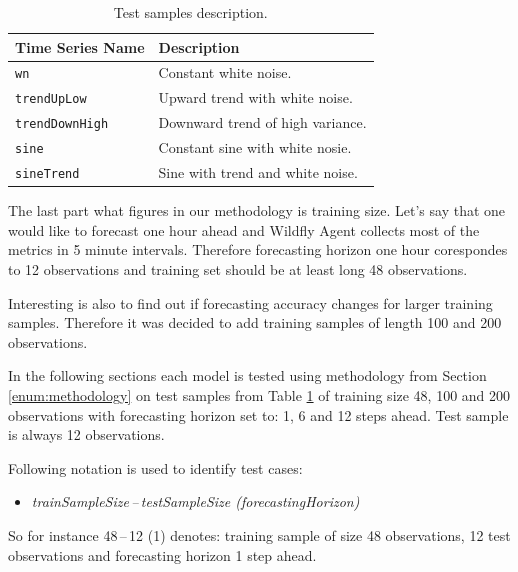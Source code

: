     \begin{table}[h]
        \begin{center}
            \begin{tabular}{l|l}
                \textbf{Time Series Name} &  \textbf{Description} \\ \hline \hline
                \texttt{wn} & Constant white noise. \\
                \texttt{trendUpLow} & Upward trend with white noise. \\
                \texttt{trendDownHigh} & Downward trend of high variance. \\
                \texttt{sine} & Constant sine with white nosie. \\
                \texttt{sineTrend} & Sine with trend and white noise. \\
            \end{tabular}
            \caption{Test samples description.}
            \label{tab:test-samples-description}
        \end{center}
    \end{table}

    The last part what figures in our methodology is training size. Let's say that one would like to forecast one hour
    ahead and Wildfly Agent collects most of the metrics in 5 minute intervals. Therefore forecasting horizon one
    hour corespondes to 12 observations and training set should be at least long 48 observations.

    Interesting is also to find out if forecasting accuracy changes for larger training samples. Therefore it
    was decided to add training samples of length 100 and 200 observations.

    In the following sections each model is tested using methodology from Section \ref{enum:methodology} on test
    samples from Table \ref{tab:test-samples-description} of training size 48, 100 and 200 observations with
    forecasting horizon set to: 1, 6 and 12 steps ahead. Test sample is always 12 observations.

    Following notation is used to identify test cases:
    \begin{itemize}
        \item \emph{trainSampleSize\,--\,testSampleSize (forecastingHorizon)}
    \end{itemize}
    So for instance 48\,--\,12 (1) denotes: training sample of size 48 observations, 12 test observations and
    forecasting horizon 1 step ahead.

